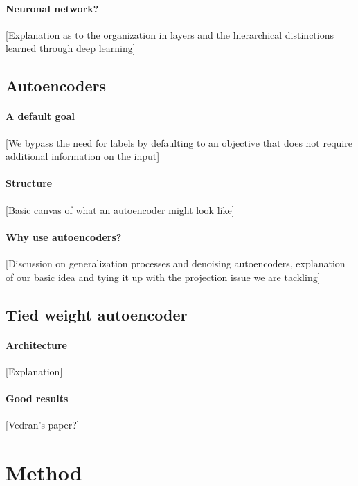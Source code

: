 \documentclass[conference]{IEEEtran}
\begin{document}
\paragraph{Neuronal network?}

[Explanation as to the organization in layers and the hierarchical distinctions learned through deep learning]

\subsection{Autoencoders}

\paragraph{A default goal}
[We bypass the need for labels by defaulting to an objective that does not require additional information on the input]

\paragraph{Structure}
[Basic canvas of what an autoencoder might look like]

\paragraph{Why use autoencoders?}
[Discussion on generalization processes and denoising autoencoders, explanation of our basic idea and tying it up with the projection issue we are tackling]

\subsection{Tied weight autoencoder}

\paragraph{Architecture}
[Explanation]

\paragraph{Good results}
[Vedran's paper?]

\section{Method}
\end{document}
